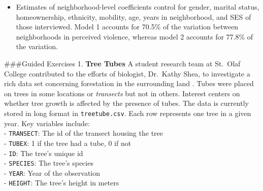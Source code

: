 \documentclass[
]{krantz}
\providecommand{\tightlist}{%
  \setlength{\itemsep}{0pt}\setlength{\parskip}{0pt}}
\begin{document}
\begin{itemize}
\tightlist
\item
  Estimates of neighborhood-level coefficients control for gender, marital status, homeownership, ethnicity, mobility, age, years in neighborhood, and SES of those interviewed. Model 1 accounts for 70.5\% of the variation between neighborhoods in perceived violence, whereas model 2 accounts for 77.8\% of the variation.
\end{itemize}

\#\#\#Guided Exercises
1. \textbf{Tree Tubes}
A student research team at St.~Olaf College contributed to the efforts of biologist, Dr.~Kathy Shea, to investigate a rich data set concerning forestation in the surrounding land \citep{Eisinger2011}. Tubes were placed on trees in some locations or \emph{transects} but not in others. Interest centers on whether tree growth is affected by the presence of tubes. The data is currently stored in long format in \texttt{treetube.csv}. Each row represents one tree in a given year. Key variables include:\\
- \texttt{TRANSECT}: The id of the transect housing the tree\\
- \texttt{TUBEX}: 1 if the tree had a tube, 0 if not\\
- \texttt{ID}: The tree's unique id\\
- \texttt{SPECIES}: The tree's species\\
- \texttt{YEAR}: Year of the observation\\
- \texttt{HEIGHT}: The tree's height in meters\\
\end{document}
